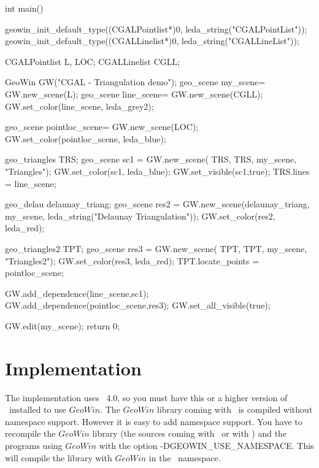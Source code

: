 \begin{cprog}
int main()
{
  geowin_init_default_type((CGALPointlist*)0, leda_string("CGALPointList"));
  geowin_init_default_type((CGALLinelist*)0, leda_string("CGALLineList"));

  CGALPointlist L, LOC;
  CGALLinelist  CGLL;

  GeoWin GW("CGAL - Triangulation demo");
  geo_scene my_scene= GW.new_scene(L); 
  geo_scene line_scene= GW.new_scene(CGLL);
  GW.set_color(line_scene, leda_grey2);

  geo_scene pointloc_scene= GW.new_scene(LOC);
  GW.set_color(pointloc_scene, leda_blue);

  geo_triangles TRS;
  geo_scene sc1 = GW.new_scene( TRS, TRS, my_scene, "Triangles"); 
  GW.set_color(sc1, leda_blue);
  GW.set_visible(sc1,true);
  TRS.lines = line_scene;
 
  geo_delau delaunay_triang;
  geo_scene res2 = GW.new_scene(delaunay_triang, my_scene, 
                                leda_string("Delaunay Triangulation"));
  GW.set_color(res2, leda_red);

  geo_triangles2 TPT;
  geo_scene res3 = GW.new_scene( TPT, TPT, my_scene, "Triangles2"); 
  GW.set_color(res3, leda_red);
  TPT.locate_points = pointloc_scene;
  
  GW.add_dependence(line_scene,sc1);
  GW.add_dependence(pointloc_scene,res3);
  GW.set_all_visible(true);

  GW.edit(my_scene);
  return 0;  
}
\end{cprog}

\section{Implementation}
The implementation uses \leda\ 4.0, so you must have this or a higher version
of \leda\ installed to use
$GeoWin$. The $GeoWin$ library coming with \leda\ is compiled without namespace support.
However it is easy to add namespace support.
You have to recompile the $GeoWin$ library (the sources coming with \cgal\ or with \leda)
and the programs using $GeoWin$ with the option
-DGEOWIN\_USE\_NAMESPACE. This will compile the library with $GeoWin$ in the \cgal\ namespace.



